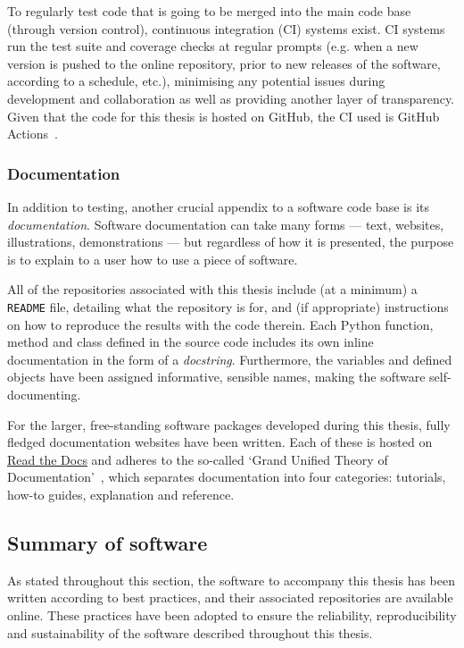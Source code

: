 
To regularly test code that is going to be merged into the main code base
(through version control), continuous integration (CI) systems exist. CI systems
run the test suite and coverage checks at regular prompts (e.g. when a new
version is pushed to the online repository, prior to new releases of the
software, according to a schedule, etc.), minimising any potential issues during
development and collaboration as well as providing another layer of
transparency. Given that the code for this thesis is hosted on GitHub, the CI
used is GitHub Actions~\cite{github-actions}.

\subsubsection{Documentation}

In addition to testing, another crucial appendix to a software code base is its
\emph{documentation}. Software documentation can take many forms --- text,
websites, illustrations, demonstrations --- but regardless of how it is
presented, the purpose is to explain to a user how to use a piece of software.

All of the repositories associated with this thesis include (at a minimum) a
\texttt{README} file, detailing what the repository is for, and (if
appropriate) instructions on how to reproduce the results with the code therein.
Each Python function, method and class defined in the source code includes its
own inline documentation in the form of a \emph{docstring}. Furthermore, the
variables and defined objects have been assigned informative, sensible names,
making the software self-documenting.

For the larger, free-standing software packages developed during this thesis,
fully fledged documentation websites have been written. Each of these is hosted
on \href{https://readthedocs.org/}{Read the Docs} and adheres to the so-called
`Grand Unified Theory of Documentation'~\cite{documentation}, which separates
documentation into four categories: tutorials, how-to guides, explanation and
reference.

\subsection{Summary of software}

As stated throughout this section, the software to accompany this thesis has
been written according to best practices, and their associated repositories are
available online. These practices have been adopted to ensure the reliability,
reproducibility and sustainability of the software described throughout this
thesis.

